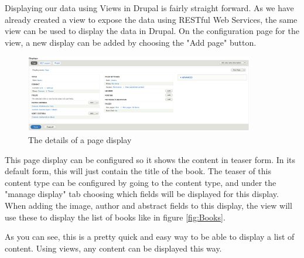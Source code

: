 Displaying our data using Views in Drupal is fairly straight forward. As we have already created a view to expose the data using RESTful Web Services, the same view can be used to display the data in Drupal. On the configuration page for the view, a new display can be added by choosing the "Add page" button. 

\begin{figure}[h]
	\centering
	\includegraphics[width=10cm]{./img/Page_View_Config.png}
	\caption[Details of a page display]{The details of a page display}
\end{figure}

This page display can be configured so it shows the content in teaser form. In its default form, this will just contain the title of the book. The teaser of this content type can be configured by going to the content type, and under the "manage display" tab choosing which fields will be displayed for this display. When adding the image, author and abstract fields to this display, the view will use these to display the list of books like in figure \ref{fig:Books}.

As you can see, this is a pretty quick and easy way to be able to display a list of content. Using views, any content can be displayed this way.

